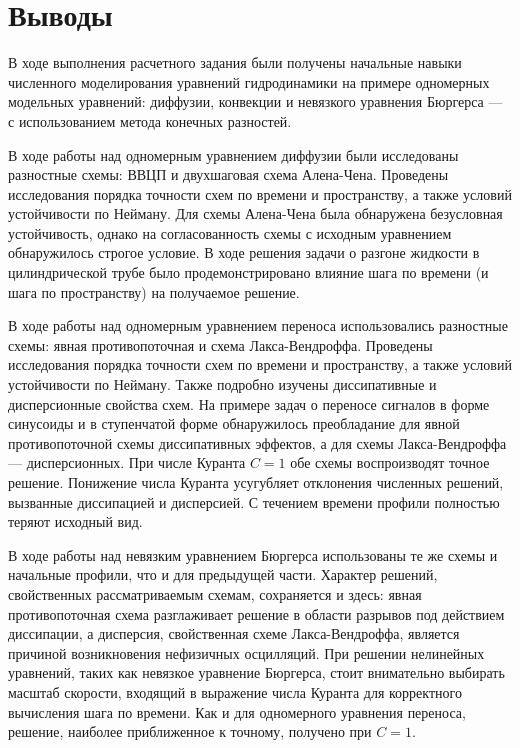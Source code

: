 \newpage

\section{Выводы}

В ходе выполнения расчетного задания были получены начальные навыки численного моделирования уравнений гидродинамики на примере одномерных модельных уравнений: диффузии, конвекции и невязкого уравнения Бюргерса — с использованием метода конечных разностей.

В ходе работы над одномерным уравнением диффузии были исследованы разностные схемы: ВВЦП и двухшаговая схема Алена-Чена. Проведены исследования порядка точности схем по времени и пространству, а также условий устойчивости по Нейману. Для схемы Алена-Чена была обнаружена безусловная устойчивость, однако на согласованность схемы с исходным уравнением обнаружилось строгое условие. В ходе решения задачи о разгоне жидкости в цилиндрической трубе было продемонстрировано влияние шага по времени (и шага по пространству) на получаемое решение.

В ходе работы над одномерным уравнением переноса использовались разностные схемы: явная противопоточная и схема Лакса-Вендроффа. Проведены исследования порядка точности схем по времени и пространству, а также условий устойчивости по Нейману. Также подробно изучены диссипативные и дисперсионные свойства схем. На примере задач о переносе сигналов в форме синусоиды и в ступенчатой форме обнаружилось преобладание для явной противопоточной схемы диссипативных эффектов, а для схемы Лакса-Вендроффа — дисперсионных. При числе Куранта $C=1$ обе схемы воспроизводят точное решение. Понижение числа Куранта усугубляет отклонения численных решений, вызванные диссипацией и дисперсией. С течением времени профили полностью теряют исходный вид.

В ходе работы над невязким уравнением Бюргерса использованы те же схемы и начальные профили, что и для предыдущей части. Характер решений, свойственных рассматриваемым схемам, сохраняется и здесь: явная противопоточная схема разглаживает решение в области разрывов под действием диссипации, а дисперсия, свойственная схеме Лакса-Вендроффа, является причиной возникновения нефизичных осцилляций. При решении нелинейных уравнений, таких как невязкое уравнение Бюргерса, стоит внимательно выбирать масштаб скорости, входящий в выражение числа Куранта для корректного вычисления шага по времени. Как и для одномерного уравнения переноса, решение, наиболее приближенное к точному, получено при $C=1$.